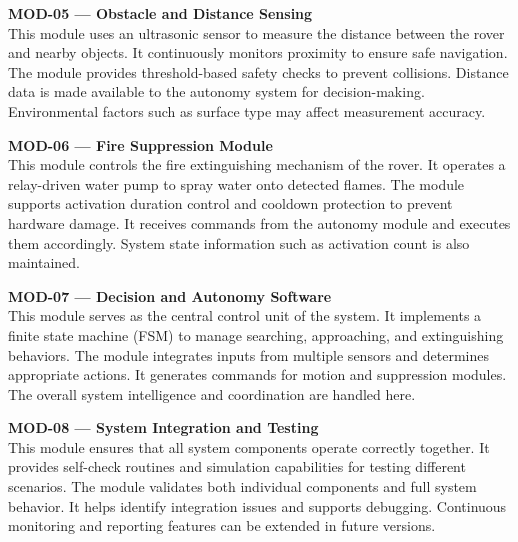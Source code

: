 \documentclass[12pt]{article}
\begin{document}
\vspace{0.3cm}

\textbf{MOD-05 — Obstacle and Distance Sensing} \\
This module uses an ultrasonic sensor to measure the distance between the rover and nearby objects. It continuously monitors proximity to ensure safe navigation. The module provides threshold-based safety checks to prevent collisions. Distance data is made available to the autonomy system for decision-making. Environmental factors such as surface type may affect measurement accuracy.

\vspace{0.3cm}

\textbf{MOD-06 — Fire Suppression Module} \\
This module controls the fire extinguishing mechanism of the rover. It operates a relay-driven water pump to spray water onto detected flames. The module supports activation duration control and cooldown protection to prevent hardware damage. It receives commands from the autonomy module and executes them accordingly. System state information such as activation count is also maintained.

\vspace{0.3cm}

\textbf{MOD-07 — Decision and Autonomy Software} \\
This module serves as the central control unit of the system. It implements a finite state machine (FSM) to manage searching, approaching, and extinguishing behaviors. The module integrates inputs from multiple sensors and determines appropriate actions. It generates commands for motion and suppression modules. The overall system intelligence and coordination are handled here.

\vspace{0.3cm}

\textbf{MOD-08 — System Integration and Testing} \\
This module ensures that all system components operate correctly together. It provides self-check routines and simulation capabilities for testing different scenarios. The module validates both individual components and full system behavior. It helps identify integration issues and supports debugging. Continuous monitoring and reporting features can be extended in future versions.
\end{document}
